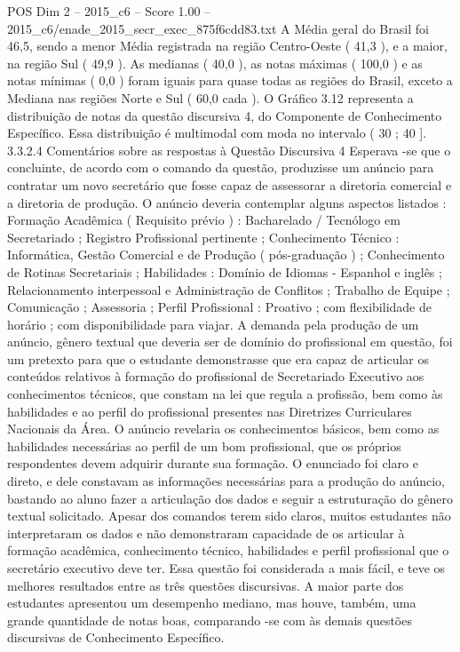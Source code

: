 \begin{textsample}{POS Dim 2 – 2015\_c6 – Score 1.00 – 2015\_c6/enade\_2015\_secr\_exec\_875f6cdd83.txt}
A Média geral do Brasil foi 46,5, sendo a menor Média registrada na região Centro-Oeste ( 41,3 ), e a maior, na região Sul ( 49,9 ).
As medianas ( 40,0 ), as notas máximas ( 100,0 ) e as notas mínimas ( 0,0 ) foram iguais para quase todas as regiões do Brasil, exceto a Mediana nas regiões Norte e Sul ( 60,0 cada ).
O Gráfico 3.12 representa a distribuição de notas da questão discursiva 4, do Componente de Conhecimento Específico.
Essa distribuição é multimodal com moda no intervalo ( 30 ; 40 ]. 3.3.2.4 Comentários sobre as respostas à Questão Discursiva 4 Esperava -se que o concluinte, de acordo com o comando da questão, produzisse um anúncio para contratar um novo secretário que fosse capaz de assessorar a diretoria comercial e a diretoria de produção.
O anúncio deveria contemplar alguns aspectos listados : Formação Acadêmica ( Requisito prévio ) : Bacharelado / Tecnólogo em Secretariado ; Registro Profissional pertinente ; Conhecimento Técnico : Informática, Gestão Comercial e de Produção ( pós-graduação ) ; Conhecimento de Rotinas Secretariais ; Habilidades : Domínio de Idiomas - Espanhol e inglês ; Relacionamento interpessoal e Administração de Conflitos ; Trabalho de Equipe ; Comunicação ; Assessoria ; Perfil Profissional : Proativo ; com flexibilidade de horário ; com disponibilidade para viajar.
A demanda pela produção de um anúncio, gênero textual que deveria ser de domínio do profissional em questão, foi um pretexto para que o estudante demonstrasse que era capaz de articular os conteúdos relativos à formação do profissional de Secretariado Executivo aos conhecimentos técnicos, que constam na lei que regula a profissão, bem como às habilidades e ao perfil do profissional presentes nas Diretrizes Curriculares Nacionais da Área.
O anúncio revelaria os conhecimentos básicos, bem como as habilidades necessárias ao perfil de um bom profissional, que os próprios respondentes devem adquirir durante sua formação.
O enunciado foi claro e direto, e dele constavam as informações necessárias para a produção do anúncio, bastando ao aluno fazer a articulação dos dados e seguir a estruturação do gênero textual solicitado.
Apesar dos comandos terem sido claros, muitos estudantes não interpretaram os dados e não demonstraram capacidade de os articular à formação acadêmica, conhecimento técnico, habilidades e perfil profissional que o secretário executivo deve ter.
Essa questão foi considerada a mais fácil, e teve os melhores resultados entre as três questões discursivas.
A maior parte dos estudantes apresentou um desempenho mediano, mas houve, também, uma grande quantidade de notas boas, comparando -se com às demais questões discursivas de Conhecimento Específico.

\end{textsample}
